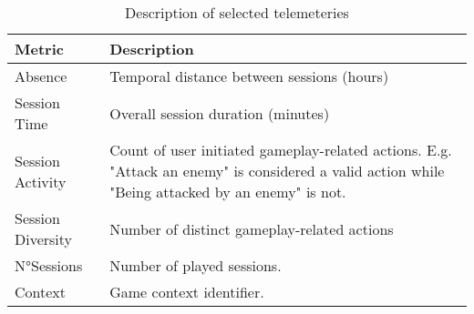 \begin{table}[H] \centering
\caption[Description of Selected Telemetries]{Description of selected telemeteries}
\label{metricsdescription_1}
  \begin{tabularx}{\textwidth}{@{}lX@{}}
    \toprule
    \textbf{Metric}      & \textbf{Description}          \\ \midrule
    {Absence}    & Temporal distance between sessions (hours)  \\
    {Session Time}     & Overall session duration (minutes)       \\ 
    {Session Activity}    & Count of user initiated gameplay-related actions. E.g. "Attack an enemy" is considered a valid action while "Being attacked by an enemy" is not.\\
    {Session Diversity}      & Number of distinct gameplay-related actions  \\ 
    {N°Sessions}    & Number of played sessions.\\ 
    {Context}    &  Game context identifier.  \\
    \bottomrule
  \end{tabularx}
\end{table}
